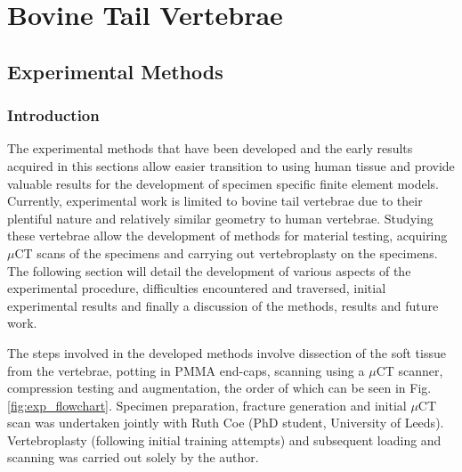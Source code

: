 \chapter{Bovine Tail Vertebrae}

\section{Experimental Methods}\label{experimental-methods}

\subsection{Introduction}

The experimental methods that have been developed and the early results acquired in this sections allow easier transition to using human tissue  and provide valuable results for the development of specimen specific finite element models. Currently, experimental work is limited to bovine tail vertebrae due to their plentiful nature and relatively similar geometry to human vertebrae. Studying these vertebrae allow the development of methods for material testing, acquiring $\mu$CT scans of the specimens and carrying out vertebroplasty on the specimens. The following section will detail the development of various aspects of the experimental procedure, difficulties encountered and traversed, initial experimental results and finally a discussion of the methods, results and future work.

The steps involved in the developed methods involve dissection of the soft tissue from the vertebrae, potting in PMMA end-caps, scanning using a $\mu$CT scanner, compression testing and augmentation, the order of which can be seen in Fig. \ref{fig:exp_flowchart}.
Specimen preparation, fracture generation and initial $\mu$CT scan was undertaken jointly with Ruth Coe (PhD student, University of Leeds). Vertebroplasty (following initial training attempts) and subsequent loading and scanning was carried out solely by the author.

